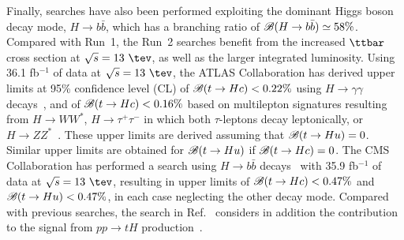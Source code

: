 Finally, searches have also been performed exploiting the dominant Higgs boson decay mode, $H\to b\bar{b}$, which has a branching ratio 
of $\mathscr{B}(H\to b\bar{b})\simeq 58\%$. Compared with Run~1, the Run~2 searches benefit from the increased $\ttbar$ cross section at $\sqrt{s}=13~\tev$, 
as well as the larger integrated luminosity.
Using 36.1 fb$^{-1}$ of data at $\sqrt{s}=13~\tev$, the ATLAS Collaboration has derived upper limits at 95\% confidence level (CL) of  
$\mathscr{B}(t\to Hc)<0.22\%$ using $H\to \gamma\gamma$ decays~\cite{Aaboud:2017mfd}, and of $\mathscr{B}(t\to Hc)<0.16\%$ based on
multilepton signatures resulting from 
$H \to WW^*$, $H\to \tau^+\tau^-$ in which both $\tau$-leptons decay leptonically, or $H \to ZZ^*$~\cite{Aaboud:2018pob}.
These upper limits are derived assuming that $\mathscr{B}(t\to Hu)=0$. Similar upper limits are obtained for $\mathscr{B}(t\to Hu)$ if $\mathscr{B}(t\to Hc)=0$. 
The CMS Collaboration has performed a search using  
$H\to b\bar{b}$ decays~\cite{Sirunyan:2017uae} with 35.9 fb$^{-1}$ of data at $\sqrt{s}=13~\tev$, resulting 
in upper limits of $\mathscr{B}(t\to Hc)<0.47\%$ and $\mathscr{B}(t\to Hu)<0.47\%$, in each case neglecting the other decay mode.
Compared with previous searches, the search in Ref.~\cite{Sirunyan:2017uae} considers in addition the contribution to the signal from 
$pp \to tH$ production~\cite{Greljo:2014dka}.


